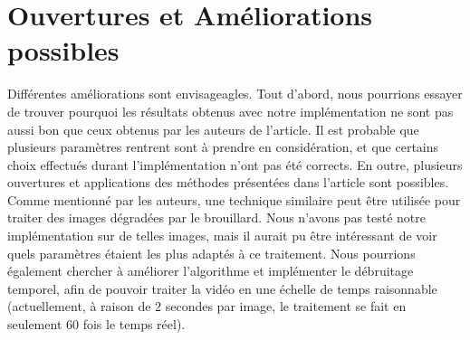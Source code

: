 \documentclass[twoside]{article}
\begin{document}
\section{Ouvertures et Améliorations possibles}
Différentes améliorations sont envisageagles. Tout d'abord, nous pourrions essayer de trouver pourquoi les résultats obtenus avec notre implémentation ne sont pas aussi bon que ceux obtenus par les auteurs de l'article. Il est probable que plusieurs paramètres rentrent sont à prendre en considération, et que certains choix effectués durant l'implémentation n'ont pas été corrects. En outre, plusieurs ouvertures et applications des méthodes présentées dans l'article sont possibles. Comme mentionné par les auteurs, une technique similaire peut être utilisée pour traiter des images dégradées par le brouillard. Nous n'avons pas testé notre implémentation sur de telles images, mais il aurait pu être intéressant de voir quels paramètres étaient les plus adaptés à ce traitement. Nous pourrions également chercher à améliorer l'algorithme et implémenter le débruitage temporel, afin de pouvoir traiter la vidéo en une échelle de temps raisonnable (actuellement, à raison de $2$ secondes par image, le traitement se fait en seulement $60$ fois le temps réel).

\end{document}

